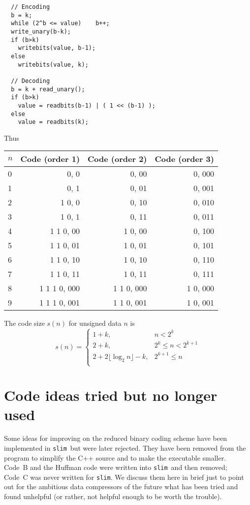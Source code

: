 \documentclass[11pt]{article}
\newcommand{\slim}{{\tt slim}}
\begin{document}
\begin{verbatim}
  // Encoding
  b = k;
  while (2^b <= value)    b++;
  write_unary(b-k);
  if (b>k)
    writebits(value, b-1);    
  else 
    writebits(value, k);

  // Decoding
  b = k + read_unary();
  if (b>k)
    value = readbits(b-1) | ( 1 << (b-1) );
  else
    value = readbits(k);
\end{verbatim}

Thus \newline \hspace*{1in}
\begin{tabular}{lrrr}
$n$ & Code (order 1) & Code (order 2) & Code (order 3)\\ \hline
0 & 0, 0 & 0, 00 & 0, 000 \\
1 & 0, 1 & 0, 01 & 0, 001 \\
2 & 1 0, 0 & 0, 10 & 0, 010 \\
3 & 1 0, 1 & 0, 11 & 0, 011 \\
4 & 1 1 0, 00 & 1 0, 00 & 0, 100 \\
5 & 1 1 0, 01 & 1 0, 01 & 0, 101 \\
6 & 1 1 0, 10 & 1 0, 10 & 0, 110 \\
7 & 1 1 0, 11 & 1 0, 11 & 0, 111 \\
8 & 1 1 1 0, 000 & 1 1 0, 000 & 1 0, 000 \\
9 & 1 1 1 0, 001 & 1 1 0, 001 & 1 0, 001 \\
\end{tabular}
\newline

The code size $s(n)$ for unsigned data $n$ is 
$$s(n) = \left \{
\begin{array}{ll}
1 + k, & n < 2^k \\
2+k, & 2^k\le n<2^{k+1} \\
2 + 2\lfloor\log_2 n\rfloor-k, & 2^{k+1} \le n \\
\end{array} \right .
$$


\section{Code ideas tried but no longer used}
\label{sec:disabled}

Some ideas for improving on the reduced binary coding scheme have been
implemented in \slim\ but were later rejected.  They have been removed
from the program to simplify the C++ source and to make the executable
smaller.  Code~B and the Huffman code were written into \slim\ and
then removed; Code~C was never written for \slim.  We discuss them
here in brief just to point out for the ambitious data compressors of
the future what has been tried and found unhelpful (or rather, not
helpful enough to be worth the trouble).
\end{document}
